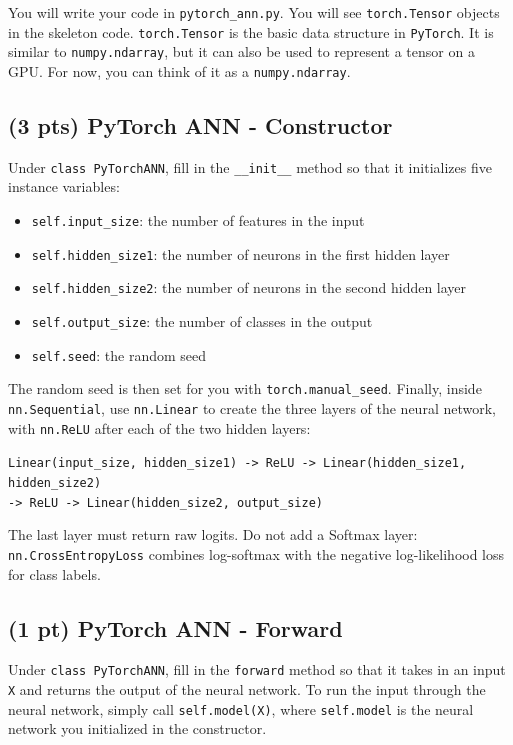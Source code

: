 \documentclass[11pt]{exam}
\begin{document}
You will write your code in \verb|pytorch_ann.py|. You will see \verb|torch.Tensor| objects in the skeleton code. \verb|torch.Tensor| is the basic data structure in \verb|PyTorch|. It is similar to \verb|numpy.ndarray|, but it can also be used to represent a tensor on a GPU. For now, you can think of it as a \verb|numpy.ndarray|.

\subsection{(3 pts) PyTorch ANN - Constructor}

Under \verb|class PyTorchANN|, fill in the \verb|__init__| method so that it initializes five instance variables:

\begin{itemize}
    \item \verb|self.input_size|: the number of features in the input
    \item \verb|self.hidden_size1|: the number of neurons in the first hidden layer
    \item \verb|self.hidden_size2|: the number of neurons in the second hidden layer
    \item \verb|self.output_size|: the number of classes in the output
    \item \verb|self.seed|: the random seed
\end{itemize}
The random seed is then set for you with \verb|torch.manual_seed|. Finally, inside \verb|nn.Sequential|, use \verb|nn.Linear| to create the three layers of the neural network, with \verb|nn.ReLU| after each of the two hidden layers:
\begin{center}
\verb|Linear(input_size, hidden_size1) -> ReLU -> Linear(hidden_size1, hidden_size2)| \\
\verb|-> ReLU -> Linear(hidden_size2, output_size)|
\end{center}
The last layer must return raw logits. Do not add a Softmax layer: \verb|nn.CrossEntropyLoss| combines log-softmax with the negative log-likelihood loss for class labels.

\subsection{(1 pt) PyTorch ANN - Forward}
Under \verb|class PyTorchANN|, fill in the \verb|forward| method so that it takes in an input \verb|X| and returns the output of the neural network. To run the input through the neural network, simply call \verb|self.model(X)|, where \verb|self.model| is the neural network you initialized in the constructor.
\end{document}
